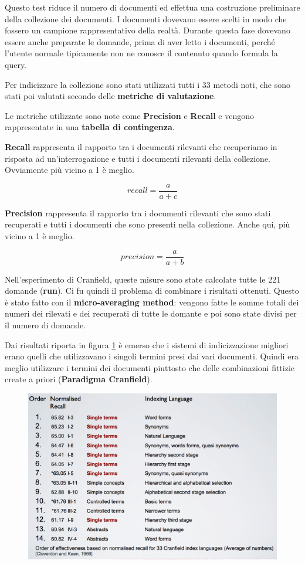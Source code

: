 Questo test riduce il numero di documenti ed effettua una costruzione preliminare della collezione dei documenti. I documenti dovevano essere scelti in modo che fossero un campione rappresentativo della realtà. Durante questa fase dovevano essere anche preparate le domande, prima di aver letto i documenti, perché l'utente normale tipicamente non ne conosce il contenuto quando formula la query.

Per indicizzare la collezione sono stati utilizzati tutti i 33 metodi noti, che sono stati poi valutati secondo delle \textbf{metriche di valutazione}.

Le metriche utilizzate sono note come \textbf{Precision} e \textbf{Recall} e vengono rappresentate in una \textbf{tabella di contingenza}.


\noindent \textbf{Recall} rappresenta il rapporto tra i documenti rilevanti che recuperiamo in risposta ad un'interrogazione e tutti i documenti rilevanti della collezione. Ovviamente più vicino a 1 è meglio.

$$
recall = \frac{a}{a+c}
$$

\noindent \textbf{Precision} rappresenta il rapporto tra i documenti rilevanti che sono stati recuperati e tutti i documenti che sono presenti nella collezione. Anche qui, più vicino a 1 è meglio.

$$
precision = \frac{a}{a+b}
$$

Nell'esperimento di Cranfield, queste misure sono state calcolate tutte le 221 domande (\textbf{run}).
Ci fu quindi il problema di combinare i risultati ottenuti. Questo è stato fatto con il \textbf{micro-averaging method}: vengono fatte le somme totali dei numeri dei rilevati e dei recuperati di tutte le domante e poi sono state divisi per il numero di domande.

Dai risultati riporta in figura \ref{l13:fig1} è emerso che i sistemi di indicizzazione migliori erano quelli che utilizzavano i singoli termini presi dai vari documenti. Quindi era meglio utilizzare i termini dei documenti piuttosto che delle combinazioni fittizie create a priori (\textbf{Paradigma Cranfield}). 

\begin{figure}
	\centering
	\includegraphics[width=.6\textwidth]{images/l13-fig-1.png}
	\label{l13:fig1}
\end{figure}

